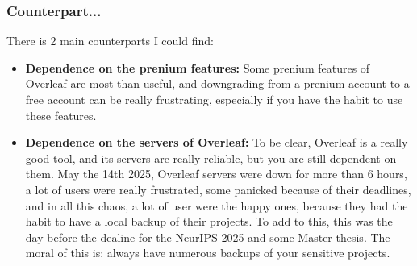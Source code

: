 \subsubsection{Counterpart...}

There is 2 main counterparts I could find:
\begin{itemize}
  \item \textbf{Dependence on the prenium features:} Some prenium features of Overleaf are most than useful, and downgrading from a prenium account to a free account can be really frustrating, especially if you have the habit to use these features.
  \item \textbf{Dependence on the servers of Overleaf:} To be clear, Overleaf is a really good tool, and its servers are really reliable, but you are still dependent on them.\newline
  {\color{blue} %
    May the 14th 2025, Overleaf servers were down for more than 6 hours, a lot of users were really frustrated, some panicked because of their deadlines, and in all this chaos, a lot of user were the happy ones, because they had the habit to have a local backup of their projects. To add to this, this was the day before the dealine for the NeurIPS 2025 and some Master thesis.
  }\newline
  The moral of this is: always have numerous backups of your sensitive projects.
\end{itemize}







